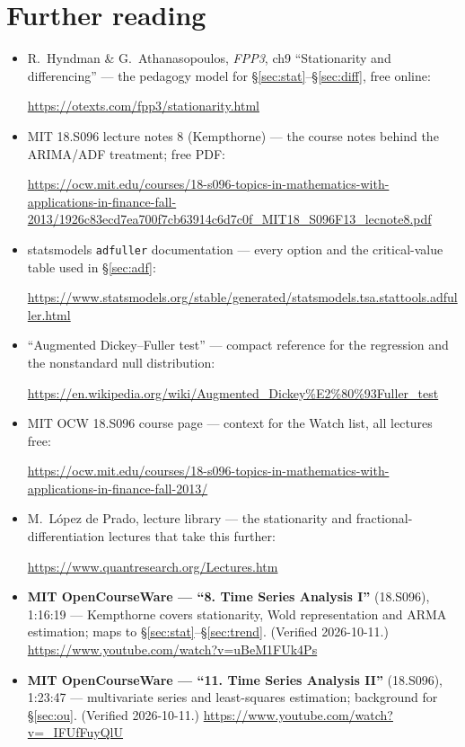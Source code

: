 \section*{Further reading}
\begin{itemize}
\item R.~Hyndman \& G.~Athanasopoulos, \emph{FPP3}, ch9
``Stationarity and differencing'' --- the pedagogy model for
\S\ref{sec:stat}--\S\ref{sec:diff}, free online:

\url{https://otexts.com/fpp3/stationarity.html}
\item MIT 18.S096 lecture notes 8 (Kempthorne) --- the course notes
behind the ARIMA/ADF treatment; free PDF:

\url{https://ocw.mit.edu/courses/18-s096-topics-in-mathematics-with-applications-in-finance-fall-2013/1926c83ecd7ea700f7cb63914c6d7c0f_MIT18_S096F13_lecnote8.pdf}
\item statsmodels \texttt{adfuller} documentation --- every option
and the critical-value table used in \S\ref{sec:adf}:

\url{https://www.statsmodels.org/stable/generated/statsmodels.tsa.stattools.adfuller.html}
\item ``Augmented Dickey--Fuller test'' --- compact reference for
the regression and the nonstandard null distribution:

\url{https://en.wikipedia.org/wiki/Augmented_Dickey\%E2\%80\%93Fuller_test}
\item MIT OCW 18.S096 course page --- context for the Watch list,
all lectures free:

\url{https://ocw.mit.edu/courses/18-s096-topics-in-mathematics-with-applications-in-finance-fall-2013/}
\item M.~L\'opez de Prado, lecture library --- the stationarity and
fractional-differentiation lectures that take this further:

\url{https://www.quantresearch.org/Lectures.htm}
\end{itemize}

\begin{rulebox}
\begin{itemize}
\item \textbf{MIT OpenCourseWare --- ``8. Time Series Analysis I''}
(18.S096), 1:16:19 --- Kempthorne covers stationarity, Wold
representation and ARMA estimation; maps to
\S\ref{sec:stat}--\S\ref{sec:trend}. (Verified 2026-10-11.)
\url{https://www.youtube.com/watch?v=uBeM1FUk4Ps}
\item \textbf{MIT OpenCourseWare --- ``11. Time Series Analysis II''}
(18.S096), 1:23:47 --- multivariate series and least-squares
estimation; background for \S\ref{sec:ou}. (Verified 2026-10-11.)
\url{https://www.youtube.com/watch?v=_IFUfFuyQlU}
\end{itemize}
\end{rulebox}
